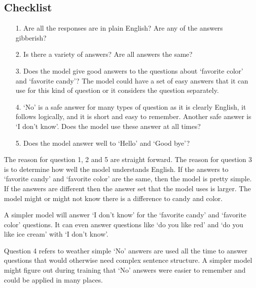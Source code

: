 \subsection{Checklist} 

\begin{itemize}
	
	\item [1.] Are all the responses are in plain English? Are any of the answers gibberish?
	
	\item [2.] Is there a  variety of answers? Are all answers the same?
	
	\item [3.] Does the model give good answers to the questions about `favorite color' and `favorite candy'? The model could have a set of easy answers that it can use for this kind of question or it considers the question separately. 
	
	\item [4.] `No' is a safe answer for many types of question as it is clearly English, it follows logically, and it is short and easy to remember. Another safe answer is `I don't know'. Does the model use these answer at all times?
	
	\item [5.] Does the model answer well to `Hello' and `Good bye'?
	
\end{itemize}

The reason for question 1, 2 and 5 are straight forward. The reason for question 3 is to determine how well the model understands English. If the answers to `favorite candy' and `favorite color' are the same, then the model is pretty simple. If the answers are different then the answer set that the model uses is larger. The model might or might not know there is a difference to candy and color. %

A simpler model will answer `I don't know' for the `favorite candy' and `favorite color' questions. It can even answer questions like `do you like red' and `do you like ice cream' with `I don't know'. 

Question 4 refers to weather simple `No' answers are used all the time to answer questions that would otherwise need complex sentence structure. A simpler model might figure out during training that `No' answers were easier to remember and could be applied in many places.


